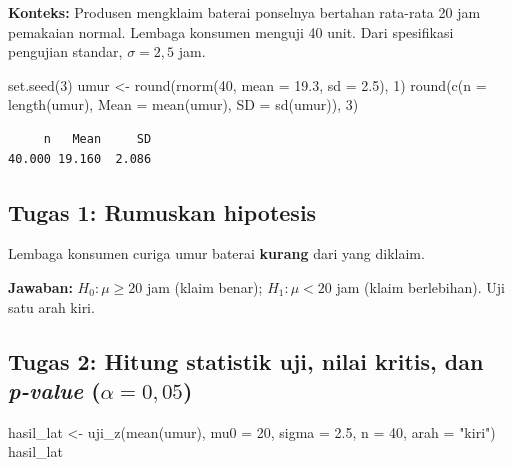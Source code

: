 \documentclass[
  indonesian,
  letterpaper,
]{book}
\newenvironment{Shaded}{\begin{snugshade}}{\end{snugshade}}
\newcommand{\AttributeTok}[1]{\textcolor[rgb]{0.40,0.45,0.13}{#1}}
\newcommand{\DecValTok}[1]{\textcolor[rgb]{0.68,0.00,0.00}{#1}}
\newcommand{\FloatTok}[1]{\textcolor[rgb]{0.68,0.00,0.00}{#1}}
\newcommand{\FunctionTok}[1]{\textcolor[rgb]{0.28,0.35,0.67}{#1}}
\newcommand{\NormalTok}[1]{\textcolor[rgb]{0.00,0.23,0.31}{#1}}
\newcommand{\OtherTok}[1]{\textcolor[rgb]{0.00,0.23,0.31}{#1}}
\newcommand{\StringTok}[1]{\textcolor[rgb]{0.13,0.47,0.30}{#1}}
\begin{document}
\textbf{Konteks:} Produsen mengklaim baterai ponselnya bertahan
rata-rata 20 jam pemakaian normal. Lembaga konsumen menguji 40 unit.
Dari spesifikasi pengujian standar, \(\sigma = 2{,}5\) jam.

\begin{Shaded}
\begin{Highlighting}[]
\FunctionTok{set.seed}\NormalTok{(}\DecValTok{3}\NormalTok{)}
\NormalTok{umur }\OtherTok{\textless{}{-}} \FunctionTok{round}\NormalTok{(}\FunctionTok{rnorm}\NormalTok{(}\DecValTok{40}\NormalTok{, }\AttributeTok{mean =} \FloatTok{19.3}\NormalTok{, }\AttributeTok{sd =} \FloatTok{2.5}\NormalTok{), }\DecValTok{1}\NormalTok{)}
\FunctionTok{round}\NormalTok{(}\FunctionTok{c}\NormalTok{(}\AttributeTok{n =} \FunctionTok{length}\NormalTok{(umur), }\AttributeTok{Mean =} \FunctionTok{mean}\NormalTok{(umur), }\AttributeTok{SD =} \FunctionTok{sd}\NormalTok{(umur)), }\DecValTok{3}\NormalTok{)}
\end{Highlighting}
\end{Shaded}

\begin{verbatim}
     n   Mean     SD 
40.000 19.160  2.086 
\end{verbatim}

\subsection{Tugas 1: Rumuskan
hipotesis}\label{tugas-1-rumuskan-hipotesis}

Lembaga konsumen curiga umur baterai \textbf{kurang} dari yang diklaim.

\textbf{Jawaban:} \(H_0: \mu \ge 20\) jam (klaim benar);
\(H_1: \mu < 20\) jam (klaim berlebihan). Uji satu arah kiri.

\subsection{\texorpdfstring{Tugas 2: Hitung statistik uji, nilai kritis,
dan \emph{p-value}
(\(\alpha = 0{,}05\))}{Tugas 2: Hitung statistik uji, nilai kritis, dan p-value (\textbackslash alpha = 0\{,\}05)}}\label{tugas-2-hitung-statistik-uji-nilai-kritis-dan-p-value-alpha-005}

\begin{Shaded}
\begin{Highlighting}[]
\NormalTok{hasil\_lat }\OtherTok{\textless{}{-}} \FunctionTok{uji\_z}\NormalTok{(}\FunctionTok{mean}\NormalTok{(umur), }\AttributeTok{mu0 =} \DecValTok{20}\NormalTok{, }\AttributeTok{sigma =} \FloatTok{2.5}\NormalTok{, }\AttributeTok{n =} \DecValTok{40}\NormalTok{, }\AttributeTok{arah =} \StringTok{"kiri"}\NormalTok{)}
\NormalTok{hasil\_lat}
\end{Highlighting}
\end{Shaded}
\end{document}
